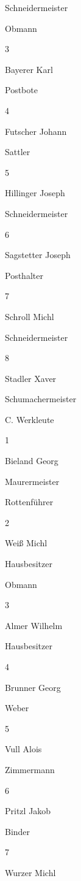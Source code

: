 \documentclass[12pt,a4paper]{book}
\begin{document}
Schneidermeister

Obmann

3

Bayerer Karl

Postbote



4

Futscher Johann

Sattler



5

Hillinger Joseph

Schneidermeister



6

Sagstetter Joseph

Posthalter



7

Schroll Michl

Schneidermeister



8

Stadler Xaver

Schumachermeister





C. Werkleute

1

Bieland Georg

Maurermeister

Rottenführer

2

Weiß Michl

Hausbesitzer

Obmann

3

Almer Wilhelm

Hausbesitzer



4

Brunner Georg

Weber



5

Vull Alois

Zimmermann



6

Pritzl Jakob

Binder



7

Wurzer Michl
\end{document}
